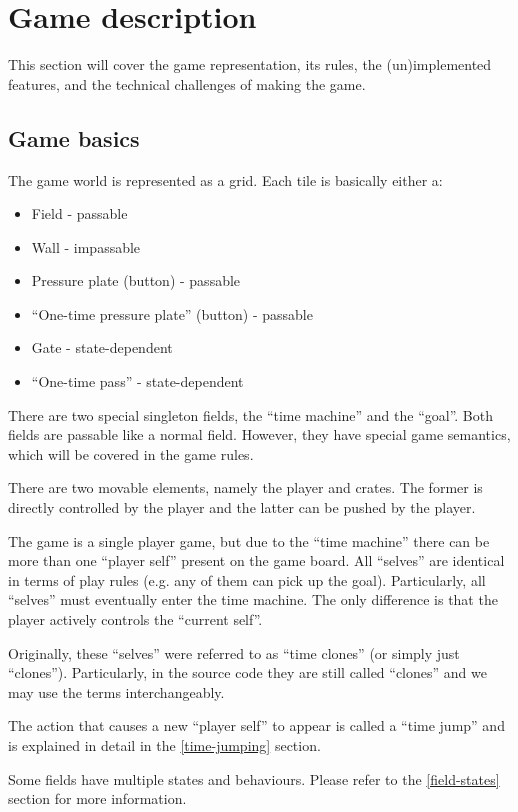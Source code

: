 \section{Game description} 
This section will cover the game representation, its rules, the
(un)implemented features, and the technical challenges of making the
game.

\subsection{Game basics}
The game world is represented as a grid.  Each tile is basically
either a:

\begin{itemize}
\item Field - passable
\item Wall - impassable
\item Pressure plate (button) - passable
\item ``One-time pressure plate'' (button) - passable
\item Gate - state-dependent
\item ``One-time pass'' - state-dependent
\end{itemize}

There are two special singleton fields, the ``time machine'' and the
``goal''.  Both fields are passable like a normal field.  However,
they have special game semantics, which will be covered in the game
rules.

There are two movable elements, namely the player and crates.  The
former is directly controlled by the player and the latter can be
pushed by the player.

The game is a single player game, but due to the ``time machine''
there can be more than one ``player self'' present on the game board.
All ``selves'' are identical in terms of play rules (e.g. any of
them can pick up the goal).  Particularly, all ``selves'' must
eventually enter the time machine.  The only difference is that the
player actively controls the ``current self''.

Originally, these ``selves'' were referred to as ``time clones'' (or
simply just ``clones'').  Particularly, in the source code they are
still called ``clones'' and we may use the terms interchangeably.

The action that causes a new ``player self'' to appear is called a
``time jump'' and is explained in detail in the \ref{time-jumping}
section.

Some fields have multiple states and behaviours.  Please refer to
the \ref{field-states} section for more information.


